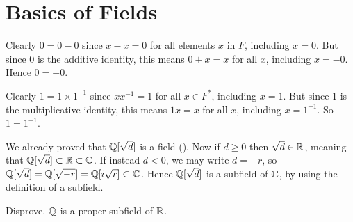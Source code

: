 \section{Basics of Fields}
\begin{questions}
    \item \begin{partquestions}{\alph*}
        \item Clearly $0 = 0 - 0$ since $x - x = 0$ for all elements $x$ in $F$, including $x = 0$. But since 0 is the additive identity, this means $0 + x = x$ for all $x$, including $x = -0$. Hence $0 = -0$.
        \item Clearly $1 = 1\times 1^{-1}$ since $xx^{-1} = 1$ for all $x \in F^\ast$, including $x = 1$. But since 1 is the multiplicative identity, this means $1x = x$ for all $x$, including $x = 1^{-1}$. So $1 = 1^{-1}$.
    \end{partquestions}

    \item We already proved that $\mathbb{Q}[\sqrt{d}]$ is a field (). Now if $d \geq 0$ then $\sqrt{d} \in \mathbb{R}$, meaning that $\mathbb{Q}[\sqrt{d}] \subset \mathbb{R} \subset \mathbb{C}$. If instead $d < 0$, we may write $d = -r$, so $\mathbb{Q}[\sqrt{d}] = \mathbb{Q}[\sqrt{-r}] = \mathbb{Q}[i\sqrt{r}] \subset \mathbb{C}$. Hence $\mathbb{Q}[\sqrt{d}]$ is a subfield of $\mathbb{C}$, by using the definition of a subfield.

    \item Disprove. $\mathbb{Q}$ is a proper subfield of $\mathbb{R}$.
\end{questions}
